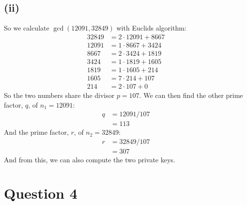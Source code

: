 \documentclass[a4paper, fleqn]{article}
\begin{document}
\subsection{(ii)}
So we calculate $\gcd(12091, 32849)$ with Euclids algorithm:
\begin{align*}
  32849 &= 2\cdot 12091 + 8667 \\
  12091 &= 1\cdot 8667  + 3424 \\
  8667  &= 2\cdot 3424  + 1819 \\
  3424  &= 1\cdot 1819  + 1605 \\
  1819  &= 1\cdot 1605  + 214  \\
  1605  &= 7\cdot 214   + 107  \\
  214   &= 2\cdot 107   + 0
\end{align*}
So the two numbers share the divisor $p=107$. We can then find the other prime factor, $q$, of $n_1=12091$:
\begin{align*}
  q &= 12091 / 107 \\
    &= 113
\end{align*}
And the prime factor, $r$, of $n_2=32849$:
\begin{align*}
  r &= 32849 / 107 \\
    &= 307
\end{align*}
And from this, we can also compute the two private keys.

\section{Question 4}
\end{document}
